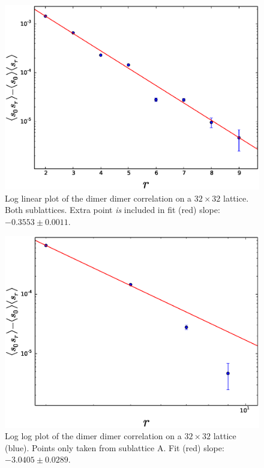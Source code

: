 \documentclass[aps,floatfix,11pt]{revtex4-1}
\begin{document}
\begin{figure}[h]
    \centering
    \includegraphics[width=8.5 cm]{s_dimer_dimer_cor_loglin_both_sublat_32x32_extra_pnt}
    \caption{Log linear plot of the dimer dimer correlation on a $32\times32$ lattice. 
        Both sublattices. Extra point \textit{is} included in 
        fit (red) slope: $ -0.3553 \pm 0.0011$.
    \label{fig:s_dimer_dimer_cor_loglin_both_sublat_32x32_extra_pnt}}
\end{figure}


\begin{figure}[h]
    \centering
    \includegraphics[width=8.5 cm]{s_dimer_dimer_cor_loglog_one_sublat_A_32x32}
    \caption{Log log plot of the dimer dimer correlation on a $32\times32$ lattice (blue). 
        Points only taken from sublattice A. Fit (red) slope: $-3.0405 \pm 0.0289$.
    \label{fig:s_dimer_dimer_cor_loglog_one_sublat_A_32x32}}
\end{figure}
\end{document}

